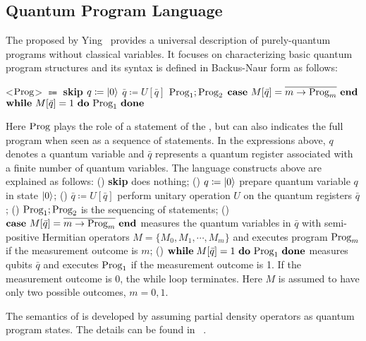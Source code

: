 \subsection{Quantum Program Language}
The {\qwhilelang} proposed by Ying~\cite{Ying2012FloydhoareLF} provides a universal description of purely-quantum programs without classical variables. It focuses on characterizing basic quantum program structures
and its syntax is defined in Backus-Naur form as follows:


%
\begin{tcolorbox}[colback=yellow!10!white,
                  colframe=white!20!black]
\begin{grammar}
%  
\label{equ:qwhile}
  \let\syntleft\relax
  \let\syntright\relax
%
<$\text{Prog}$> $\Coloneqq$ \textbf{skip}
\vsep $q \coloneqq \vert 0 \rangle$
\vsep $\bar{q} \coloneqq U[\bar{q}]$
\vsep $\text{Prog}_1;\text{Prog}_2$
\alt $\textbf{case}\ M[\bar{q}] = \overline{m \to \text{Prog}_m}\ \textbf{end}$
\alt $\textbf{while}\  M[\bar{q}]=1\ \textbf{do}\ \prog_1\ \textbf{done}$
%
\end{grammar}
\end{tcolorbox}
%
Here $\text{Prog}$ plays the role of a statement of the {\qwhilelang}, but can also indicates the full program when seen as a sequence of statements. In the expressions above, $q$ denotes a quantum variable and $\bar{q}$ represents a quantum register associated with a finite number of quantum variables. The language constructs above are explained as follows: 
\setcounter{cnt}{0}
(\showcnt)  \textbf{skip} does nothing; 
(\showcnt) $q \coloneqq \vert 0 \rangle$ prepare quantum variable $q$ in state $\vert 0 \rangle$; 
(\showcnt) $\bar{q} \coloneqq U[\bar{q}]$ perform unitary operation $U$ on the quantum registers $\bar{q}$; 
(\showcnt) $\text{Prog}_1;\text{Prog}_2$ is the sequencing of statements; 
(\showcnt) $\textbf{case}\ M[\bar{q}] = \overline{m \to \text{Prog}_m}\ \textbf{end}$ measures the quantum variables in $\bar{q}$ with semi-positive Hermitian operators $M=\{M_0,M_1, \cdots, M_m\}$ and executes program $\text{Prog}_m$ if the measurement outcome is $m$; 
(\showcnt) $\textbf{while} \; M[\bar{q}]=1\ \textbf{do}\ \prog_1\ \textbf{done}$ measures qubits $\bar{q}$ and executes $\text{Prog}_1$ if the measurement outcome is 1. If the measurement outcome is 0, the while loop terminates. Here $M$ is assumed to have only two possible outcomes, $m=0,1$.

The semantics of {\qwhilelang} is developed by assuming partial density operators as quantum program states. 
The details  can be found in ~\cite{Ying2012FloydhoareLF}.


